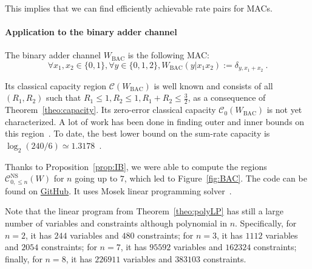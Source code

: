 \documentclass[11pt]{article}
\theoremstyle{definition}
\theoremstyle{remark}
\begin{document}
This implies that we can find efficiently achievable rate pairs for MACs.

\paragraph{Application to the binary adder channel}
The binary adder channel $W_{\text{BAC}}$ is the following MAC:
\[ \forall x_1,x_2 \in \{0,1\}, \forall y \in \{0,1,2\}, W_{\text{BAC}}(y|x_1x_2) := \delta_{y,x_1+x_2} \ .\]

Its classical capacity region $\mathcal{C}(W_{\text{BAC}})$ is well known and consists of all $(R_1,R_2)$ such that $R_1 \leq 1,R_2 \leq 1, R_1+R_2 \leq \frac{3}{2}$, as a consequence of Theorem~\ref{theo:capacity}. Its zero-error classical capacity $\mathcal{C}_0(W_{\text{BAC}})$ is not yet characterized. A lot of work has been done in finding outer and inner bounds on this region~\cite{Lindstrom69,Tilborg78,KL78,Weldon78,KLWY83,BT85,BB98,UL98,AB99,MO05,OS15}. To date, the best lower bound on the sum-rate capacity is $\log_2(240/6) \simeq 1.3178$~\cite{MO05}.

Thanks to Proposition~\ref{prop:IB}, we were able to compute the regions $\mathcal{C}_{0,\leq n}^{\mathrm{NS}}(W)$ for $n$ going up to $7$, which led to Figure~\ref{fig:BAC}. The code can be found on \href{https://github.com/pferme/MAC_NS_LP}{GitHub}. It uses Mosek linear programming solver~\cite{Mosek}.

Note that the linear program from Theorem~\ref{theo:polyLP} has still a large number of variables and constraints although polynomial in $n$. Specifically, for $n=2$, it has $244$ variables and $480$ constraints; for $n=3$, it has $1112$ variables and $2054$ constraints; for $n=7$, it has $95592$ variables and $162324$ constraints; finally, for $n=8$, it has $226911$ variables and $383103$ constraints.
\end{document}
